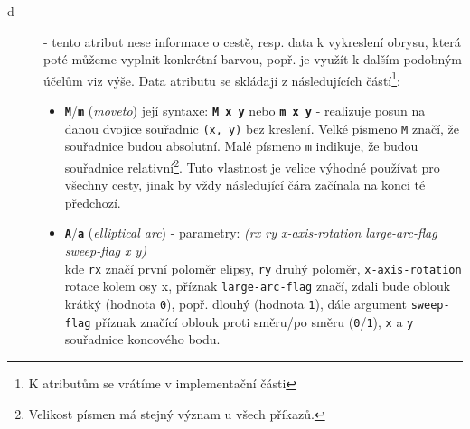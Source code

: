 \begin{description}
	\item[d]  - tento atribut nese informace o cestě, resp. data k vykreslení obrysu, která poté můžeme vyplnit konkrétní barvou, popř. je využít k dalším podobným účelům viz výše. Data atributu se skládají z následujících částí\footnote{K atributům se vrátíme v implementační části}:
	
	\begin{itemize}
		\item \texttt{\textbf{M}}/\texttt{\textbf{m}} (\textit{moveto}) její syntaxe: \texttt{\textbf{M x y}} nebo \texttt{\textbf{m x y}} - realizuje posun na danou dvojice souřadnic \texttt{(x, y)} bez kreslení. Velké písmeno \texttt{M} značí, že souřadnice budou absolutní. Malé písmeno \texttt{m} indikuje, že budou souřadnice relativní\footnote{Velikost písmen má stejný význam u všech příkazů.}. Tuto vlastnost je velice výhodné používat pro všechny cesty, jinak by vždy následující čára začínala na konci té předchozí.\\
		
		
		
		
		
		\item \texttt{\textbf{A}}/\texttt{\textbf{a}} (\textit{elliptical arc}) - parametry:  \textit{{\small (rx ry x-axis-rotation large-arc-flag sweep-flag x y)}} \\ kde \texttt{rx} značí první poloměr elipsy, \texttt{ry} druhý poloměr, \texttt{x-axis-rotation} rotace kolem osy x, příznak \texttt{large-arc-flag} značí, zdali bude oblouk krátký (hodnota \texttt{0}), popř. dlouhý (hodnota \texttt{1}), dále argument \texttt{sweep-flag} příznak značící oblouk proti směru/po směru (\texttt{0}/\texttt{1}), \texttt{x} a \texttt{y} souřadnice koncového bodu. \cite{svg}
	\end{itemize}



\end{description}
